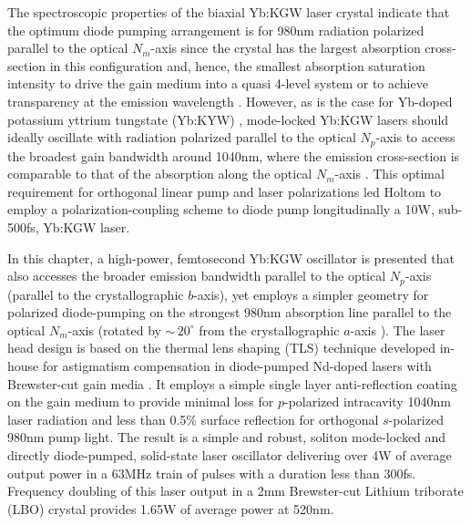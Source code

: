 The spectroscopic properties of the biaxial Yb:KGW laser crystal \cite{Biswal_thermo_optical_05} indicate that the optimum diode pumping arrangement is for 980nm radiation polarized parallel to the optical $N_m$-axis since the crystal has the largest absorption cross-section in this configuration and, hence, the smallest absorption saturation intensity to drive the gain medium into a quasi 4-level system or to achieve transparency at the emission wavelength \cite{Brenier_new_criteria}.
However, as is the case for Yb-doped potassium yttrium tungstate (Yb:KYW) \cite{Liu_diode_pumped_2001,Killi_high_peak_2005}, mode-locked Yb:KGW lasers should ideally oscillate with radiation polarized parallel to the optical $N_p$-axis to access the broadest gain bandwidth around 1040nm, where the emission cross-section is comparable to that of the absorption along the optical $N_m$-axis \cite{Holtom_mode_locked_2006,Biswal_thermo_optical_05}. This optimal requirement for orthogonal linear pump and laser polarizations led Holtom \cite{Holtom_mode_locked_2006} to employ a polarization-coupling scheme to diode pump longitudinally a 10W, sub-500fs, Yb:KGW laser.

In this chapter, a high-power, femtosecond Yb:KGW oscillator is presented that also accesses the broader emission bandwidth parallel to the optical $N_p$-axis (parallel to the crystallographic $b$-axis), yet employs a simpler geometry for polarized diode-pumping on the strongest 980nm absorption line parallel to the optical $N_m$-axis (rotated by $\sim\,20^\circ$ from the crystallographic $a$-axis \cite{Biswal_thermo_optical_05,mochalov_laser_1997,pujol_crystalline_1999}).
The laser head design is based on the thermal lens shaping (TLS) technique developed in-house for astigmatism compensation in diode-pumped Nd-doped lasers with Brewster-cut gain media \cite{Rimington_thermal_lens_2004}.
It employs a simple single layer  anti-reflection coating on the gain medium to provide minimal loss for $p$-polarized intracavity 1040nm laser radiation and less than 0.5\% surface reflection for orthogonal $s$-polarized 980nm pump light.
The result is a simple and robust, soliton mode-locked and directly diode-pumped, solid-state laser oscillator delivering over 4W of average output power in a 63MHz train of pulses with a duration less than 300fs.
Frequency doubling of this laser output in a 2mm Brewster-cut Lithium triborate (LBO) crystal provides 1.65W of average power at 520nm.

